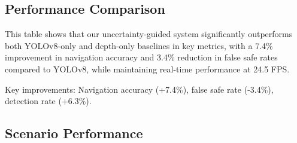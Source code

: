 \documentclass[12pt,oneside]{book}
\begin{document}
\subsection{Performance Comparison}

\begin{table}[ht]
\centering
\caption{Performance metrics comparison between uncertainty-guided system and baseline approaches}
\label{tab:comprehensive_performance}
\end{table}

This table shows that our uncertainty-guided system significantly outperforms both YOLOv8-only and depth-only baselines in key metrics, with a 7.4\% improvement in navigation accuracy and 3.4\% reduction in false safe rates compared to YOLOv8, while maintaining real-time performance at 24.5 FPS.

Key improvements: Navigation accuracy (+7.4\%), false safe rate (-3.4\%), detection rate (+6.3\%).

\subsection{Scenario Performance}
\end{document}

